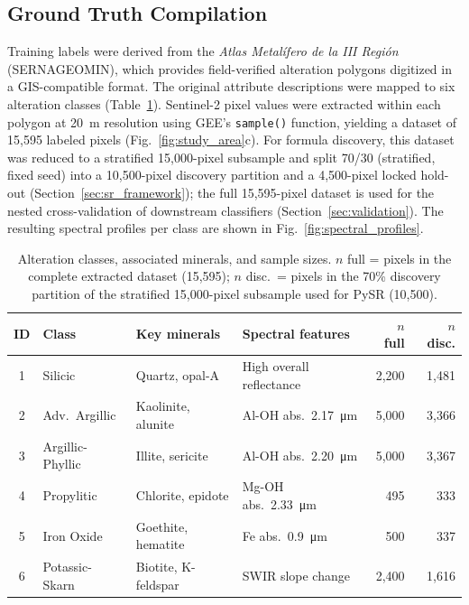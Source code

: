 \documentclass[preprint,authoryear,number]{elsarticle}
\begin{document}
\subsection{Ground Truth Compilation}

Training labels were derived from the \emph{Atlas Metal\'ifero de la III Regi\'on} (SERNAGEOMIN), which provides field-verified alteration polygons digitized in a GIS-compatible format. The original attribute descriptions were mapped to six alteration classes (Table~\ref{tab:classes}). Sentinel-2 pixel values were extracted within each polygon at \SI{20}{\meter} resolution using GEE's \texttt{sample()} function, yielding a dataset of 15{,}595 labeled pixels (Fig.~\ref{fig:study_area}c). For formula discovery, this dataset was reduced to a stratified 15{,}000-pixel subsample and split 70/30 (stratified, fixed seed) into a 10{,}500-pixel discovery partition and a 4{,}500-pixel locked hold-out (Section~\ref{sec:sr_framework}); the full 15{,}595-pixel dataset is used for the nested cross-validation of downstream classifiers (Section~\ref{sec:validation}). The resulting spectral profiles per class are shown in Fig.~\ref{fig:spectral_profiles}.

\begin{table}[h]
\centering
\caption{Alteration classes, associated minerals, and sample sizes. $n$ full = pixels in the complete extracted dataset (15{,}595); $n$ disc.\ = pixels in the 70\% discovery partition of the stratified 15{,}000-pixel subsample used for PySR (10{,}500).}
\label{tab:classes}
\begin{tabular}{clllrr}
\toprule
ID & Class & Key minerals & Spectral features & $n$ full & $n$ disc. \\
\midrule
1 & Silicic & Quartz, opal-A & High overall reflectance & 2{,}200 & 1{,}481 \\
2 & Adv.\ Argillic & Kaolinite, alunite & Al-OH abs.\ \SI{2.17}{\micro\meter} & 5{,}000 & 3{,}366 \\
3 & Argillic-Phyllic & Illite, sericite & Al-OH abs.\ \SI{2.20}{\micro\meter} & 5{,}000 & 3{,}367 \\
4 & Propylitic & Chlorite, epidote & Mg-OH abs.\ \SI{2.33}{\micro\meter} & 495 & 333 \\
5 & Iron Oxide & Goethite, hematite & Fe abs.\ \SI{0.9}{\micro\meter} & 500 & 337 \\
6 & Potassic-Skarn & Biotite, K-feldspar & SWIR slope change & 2{,}400 & 1{,}616 \\
\bottomrule
\end{tabular}
\end{table}
\end{document}
